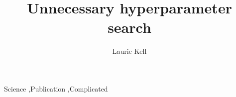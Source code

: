 \documentclass[preprint,review,12pt]{elsarticle}
\begin{document}
\begin{frontmatter}


\title{Unnecessary hyperparameter search}




\author{Laurie Kell}

\address{Henstead, UK}

\begin{abstract}

\end{abstract}

\begin{keyword}
Science \sep Publication \sep Complicated


\end{keyword}

\end{frontmatter}

\linenumbers

\end{document}
